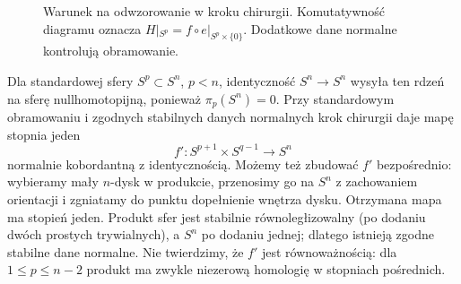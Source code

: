 \begin{figure}[htbp]
\centering
{}
\caption{Warunek na odwzorowanie w kroku chirurgii.
Komutatywność diagramu oznacza
$H|_{S^p}=f\circ e|_{S^p\times\{0\}}$.
Dodatkowe dane normalne kontrolują obramowanie.}
\label{fig:normalna-chirurgia-21}
\end{figure}

\begin{przyklad}
\label{prz:normalna-sfera-21}
Dla standardowej sfery $S^p\subset S^n$, $p<n$,
identyczność $S^n\to S^n$ wysyła ten rdzeń
na sferę nullhomotopijną, ponieważ
$\pi_p(S^n)=0$. Przy standardowym obramowaniu
i zgodnych stabilnych danych normalnych
krok chirurgii daje mapę stopnia jeden
\[
 f':S^{p+1}\times S^{q-1}\longrightarrow S^n
\]
normalnie kobordantną z identycznością.
Możemy też zbudować $f'$ bezpośrednio:
wybieramy mały $n$-dysk w produkcie,
przenosimy go na $S^n$ z zachowaniem
orientacji i zgniatamy do punktu dopełnienie
wnętrza dysku. Otrzymana mapa ma stopień jeden.
Produkt sfer jest stabilnie równoległizowalny
(po dodaniu dwóch prostych trywialnych),
a $S^n$ po dodaniu jednej; dlatego istnieją
zgodne stabilne dane normalne.
Nie twierdzimy, że $f'$ jest równoważnością:
dla $1\leq p\leq n-2$ produkt ma zwykle
niezerową homologię w stopniach pośrednich.
\end{przyklad}

